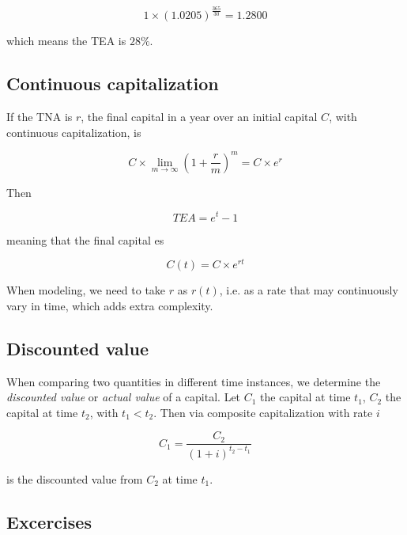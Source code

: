 \documentclass[a4paper, 12pt]{article}
\theoremstyle{definition}
\begin{document}
\begin{equation*}
    1 \times (1.0205)^{\frac{365}{30}} = 1.2800
\end{equation*}

which means the TEA is $28\%$.

\subsection{Continuous capitalization}

If the TNA is $r$, the final capital in a year over an initial capital $C$, with
continuous capitalization, is 

\begin{equation*}
    C \times \lim_{m \to \infty}\left( 1 + \frac{r}{m} \right)^m = C \times e^r
\end{equation*}

Then 

\begin{equation*}
    TEA = e^t - 1
\end{equation*}

meaning that the final capital es 

\begin{equation*}
    C(t) = C \times e^{rt}
\end{equation*}

When modeling, we need to take $r$ as $r(t)$, i.e. as a rate that may
continuously vary in time, which adds extra complexity.

\subsection{Discounted value}

When comparing two quantities in different time instances, we determine the 
\textit{discounted value} or \textit{actual value} of a capital. Let $C_1$ the
capital at time $t_1$, $C_2$ the capital at time $t_2$, with $t_1 < t_2$.
Then via composite capitalization with rate $i$ 

\begin{equation*}
    C_{1} = \frac{C_2}{(1+i)^{t_2 - t_1}}
\end{equation*}

is the discounted value from $C_2$ at time $t_1$.

\pagebreak 

\subsection{Excercises}
\end{document}
